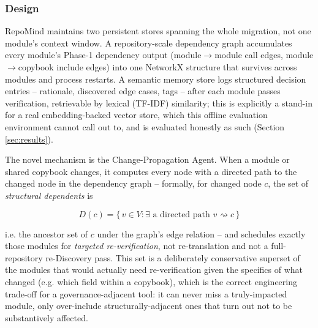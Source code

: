\documentclass[conference]{IEEEtran}
\begin{document}
\subsubsection{Design}
RepoMind maintains two persistent stores spanning the whole migration, not
one module's context window. A repository-scale dependency graph accumulates
every module's Phase-1 dependency output (module$\to$module call edges,
module$\to$copybook include edges) into one NetworkX structure that survives
across modules and process restarts. A semantic memory store logs structured
decision entries -- rationale, discovered edge cases, tags -- after each
module passes verification, retrievable by lexical (TF-IDF) similarity; this
is explicitly a stand-in for a real embedding-backed vector store, which this
offline evaluation environment cannot call out to, and is evaluated honestly
as such (Section \ref{sec:results}).

The novel mechanism is the Change-Propagation Agent. When a module or shared
copybook changes, it computes every node with a directed path to the changed
node in the dependency graph -- formally, for changed node $c$, the set of
\emph{structural dependents} is

\begin{equation}
D(c) = \{\, v \in V : \exists\text{ a directed path } v \rightsquigarrow c \,\}
\end{equation}

\noindent i.e. the ancestor set of $c$ under the graph's edge relation --
and schedules exactly those modules for \emph{targeted re-verification}, not
re-translation and not a full-repository re-Discovery pass. This set is a
deliberately conservative superset of the modules that would actually need
re-verification given the specifics of what changed (e.g. which field within
a copybook), which is the correct engineering trade-off for a
governance-adjacent tool: it can never miss a truly-impacted module, only
over-include structurally-adjacent ones that turn out not to be
substantively affected.
\end{document}
